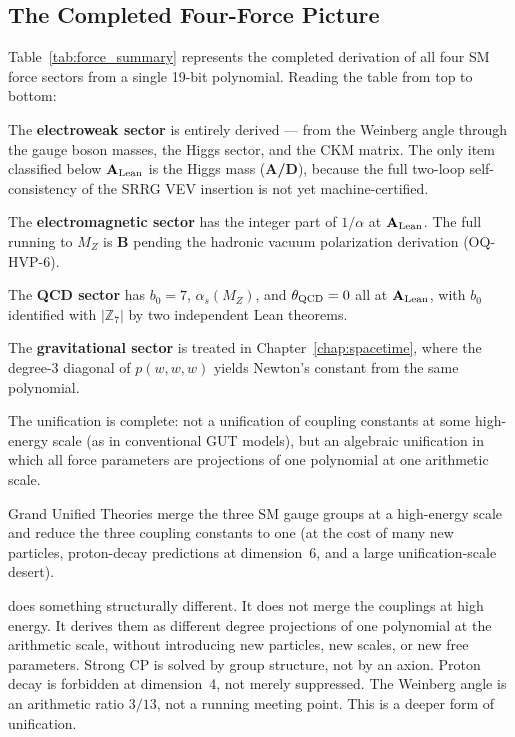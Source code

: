 \documentclass[11pt,openany]{book}
\theoremstyle{remark}
\newcommand{\GTE}{\text{GTE}}
\newcommand{\ZS}{\mathbb{Z}_7}
\newcommand{\CatAL}{\ensuremath{\textbf{A}_{\rm Lean}}}
\newcommand{\CatAD}{\textbf{A/D}}
\newcommand{\CatB}{\textbf{B}}
\begin{document}
\subsection*{The Completed Four-Force Picture}

\noindent Table~\ref{tab:force_summary} represents the completed derivation of all four
SM force sectors from a single 19-bit polynomial.  Reading the table from top to bottom:

The \textbf{electroweak sector} is entirely derived --- from the Weinberg angle through
the gauge boson masses, the Higgs sector, and the CKM matrix.  The only item classified
below \CatAL{} is the Higgs mass (\CatAD), because the full two-loop self-consistency of
the SRRG VEV insertion is not yet machine-certified.

The \textbf{electromagnetic sector} has the integer part of $1/\alpha$ at \CatAL{}.
The full running to $M_Z$ is \CatB{} pending the hadronic vacuum polarization derivation
(OQ-HVP-6).

The \textbf{QCD sector} has $b_0 = 7$, $\alpha_s(M_Z)$, and $\theta_{\rm QCD} = 0$ all
at \CatAL{}, with $b_0$ identified with $|\ZS|$ by two independent Lean theorems.

The \textbf{gravitational sector} is treated in Chapter~\ref{chap:spacetime}, where the
degree-3 diagonal of $p(w,w,w)$ yields Newton's constant from the same polynomial.

The unification is complete: not a unification of coupling constants at some high-energy
scale (as in conventional GUT models), but an algebraic unification in which all force
parameters are projections of one polynomial at one arithmetic scale.

\begin{tcolorbox}[colback=yellow!8,colframe=yellow!60!black,title={What Makes This Derivation Different from GUT Unification}]
Grand Unified Theories merge the three SM gauge groups at a high-energy scale and reduce
the three coupling constants to one (at the cost of many new particles, proton-decay
predictions at dimension~6, and a large unification-scale desert).

\GTE{} does something structurally different.  It does not merge the couplings at high
energy.  It derives them as different degree projections of one polynomial at the
arithmetic scale, without introducing new particles, new scales, or new free parameters.
Strong CP is solved by group structure, not by an axion.  Proton decay is forbidden at
dimension~4, not merely suppressed.  The Weinberg angle is an arithmetic ratio $3/13$,
not a running meeting point.  This is a deeper form of unification.
\end{tcolorbox}
\end{document}
